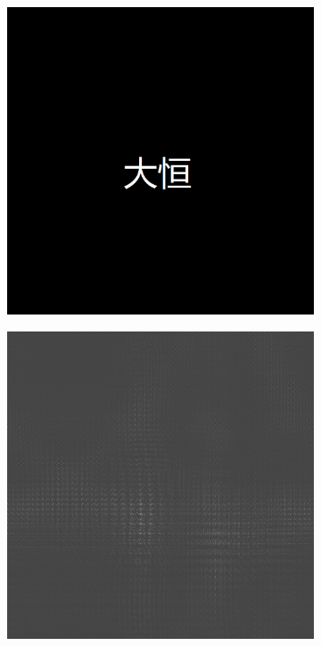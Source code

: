 \documentclass{ctexart}
\begin{document}
\begin{figure}[H]
  \centering
  \begin{subfigure}{.32\textwidth}
    \includegraphics[width=\linewidth]{数字全息实验数据/计算机模拟全息/全息样品图片/1-大恒.jpg}
  \end{subfigure}
  \begin{subfigure}{.32\textwidth}
    \includegraphics[width=\linewidth]{数字全息实验数据/计算机模拟全息/用软件模拟得到的全息图/1-大恒-全息图.jpg}

\end{subfigure}
\end{figure}
\end{document}
